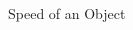 {}\documentclass[letterpaper,
compress,
xcolor=x11names,
]{beamer}
\begin{document}
\begin{frame}{Speed of an Object}
\begin{columns}
\begin{column}{0.35\linewidth}
\begin{center}
			\end{center}
		\end{column}
	\end{columns}
\end{frame}

\end{document}
